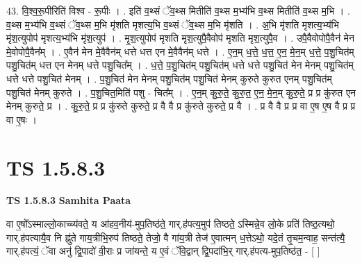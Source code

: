 \documentclass[17pt]{extarticle}
\begin{document}
43. वि॒श्व॒रू॒पीरिति॑ विश्व - रू॒पीः । . इति॑ व॒थ्सं ॅव॒थ्स मितीति॑ व॒थ्स म॒भ्य॑भि व॒थ्स मितीति॑ व॒थ्स म॒भि । . व॒थ्स म॒भ्य॑भि व॒थ्सं ॅव॒थ्स म॒भि मृ॑शति मृशत्य॒भि व॒थ्सं ॅव॒थ्स म॒भि मृ॑शति । . अ॒भि मृ॑शति मृशत्य॒भ्य॑भि मृ॑श॒त्युपोप॑ मृशत्य॒भ्य॑भि मृ॑श॒त्युप॑ । . मृ॒श॒त्युपोप॑ मृशति मृश॒त्युपै॒वैवोप॑ मृशति मृश॒त्युपै॒व । . उपै॒वैवोपोपै॒वैन॑ मेन मे॒वोपोपै॒वैन᳚म् । . ए॒वैन॑ मेन मे॒वैवैन॑म् धत्ते धत्त एन मे॒वैवैन॑म् धत्ते । . ए॒न॒म् ध॒त्ते॒ ध॒त्त॒ ए॒न॒ मे॒न॒म् ध॒त्ते॒ प॒शु॒चित॑म् पशु॒चित॑म् धत्त एन मेनम् धत्ते पशु॒चित᳚म् । . ध॒त्ते॒ प॒शु॒चित॑म् पशु॒चित॑म् धत्ते धत्ते पशु॒चित॑ मेन मेनम् पशु॒चित॑म् धत्ते धत्ते पशु॒चित॑ मेनम् । . प॒शु॒चित॑ मेन मेनम् पशु॒चित॑म् पशु॒चित॑ मेनम् कुरुते कुरुत एनम् पशु॒चित॑म् पशु॒चित॑ मेनम् कुरुते । . प॒शु॒चित॒मिति॑ पशु - चित᳚म् । . ए॒न॒म् कु॒रु॒ते॒ कु॒रु॒त॒ ए॒न॒ मे॒न॒म् कु॒रु॒ते॒ प्र प्र कु॑रुत एन मेनम् कुरुते॒ प्र । . कु॒रु॒ते॒ प्र प्र कु॑रुते कुरुते॒ प्र वै वै प्र कु॑रुते कुरुते॒ प्र वै । . प्र वै वै प्र प्र वा ए॒ष ए॒ष वै प्र प्र वा ए॒षः । \newline
\pagebreak
{}

\section{ TS 1.5.8.3 }

\textbf{TS 1.5.8.3 } \newline
\textbf{Samhita Paata} \newline

वा ए॒षो᳚ऽस्माल्लो॒काच्च्य॑वते॒ य आ॑हव॒नीय॑-मुप॒तिष्ठ॑ते॒ गार्.ह॑पत्य॒मुप॑ तिष्ठते॒ ऽस्मिन्ने॒व लो॒के प्रति॑ तिष्ठ॒त्यथो॒ गार्.ह॑पत्यायै॒व नि ह्नु॑ते गाय॒त्रीभि॒रुप॑ तिष्ठते॒ तेजो॒ वै गा॑य॒त्री तेज॑ ए॒वात्मन् ध॒त्तेऽथो॒ यदे॒तं तृ॒चम॒न्वाह॒ सन्त॑त्यै॒ गार्.ह॑पत्यं॒ ॅवा अनु॑ द्वि॒पादो॑ वी॒राः प्र जा॑यन्ते॒ य ए॒वं ॅवि॒द्वान् द्वि॒पदा॑भि॒र् गार्.ह॑पत्य-मुप॒तिष्ठ॑त॒ - [ ] \newline
\end{document}
